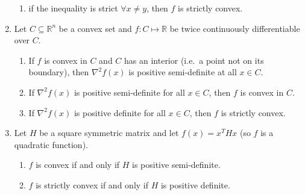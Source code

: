 \documentclass[11pt,a4paper]{article}
\begin{document}
\begin{enumerate}
\begin{enumerate}
            \item if the inequality is strict $\forall x \neq y$, then $f$ is strictly convex.
        \end{enumerate}

    \item Let $C \subseteq \mathbb{R}^n$ be a convex set and $f : C \mapsto \mathbb{R}$
        be twice continuously differentiable over $C$.
        \begin{enumerate}
            \item If $f$ is convex in $C$ and $C$ has an interior (i.e.\ a point not on its boundary),
                then $\nabla^2 f(x)$ is positive semi-definite at all $x \in C$.

            \item If $\nabla^2 f(x)$ is positive semi-definite for all $x \in C$, then $f$ is convex in $C$.

            \item If $\nabla^2 f(x)$ is positive definite for all $x \in C$, then $f$ is strictly convex.
        \end{enumerate}

    \item Let $H$ be a square symmetric matrix and let $f(x) = x^T H x$
        (so $f$ is a quadratic function).
        \begin{enumerate}
            \item $f$ is convex if and only if $H$ is positive semi-definite.

            \item $f$ is strictly convex if and only if $H$ is positive definite.
        \end{enumerate}
\end{enumerate}
\end{document}
